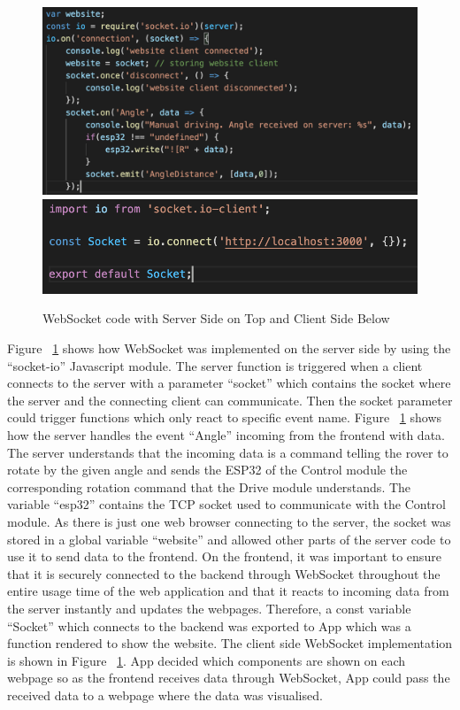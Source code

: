 \documentclass[a4paper]{article}
\begin{document}
\begin{figure}[H]
	\begin{Center}
		\includegraphics[width = 0.7\linewidth]{./images/WebSocket.png}
        \includegraphics[width = 0.7\linewidth]{./images/SocketClient.png}
		\caption{WebSocket code with Server Side on Top and Client Side Below}
        \label{fig:websocketServer}
	\end{Center}
\end{figure}



Figure ~\ref{fig:websocketServer} shows how WebSocket was implemented on the server 
side by using the “socket-io” Javascript module. \cite{WebSocketAPI} The server function is triggered 
when a client connects to the server with a parameter “socket” which contains the socket where 
the server and the connecting client can communicate. Then the socket parameter could trigger 
functions which only react to specific event name. Figure ~\ref{fig:websocketServer} shows how the server handles the 
event “Angle” incoming from the frontend with data. The server understands that the incoming 
data is a command telling the rover to rotate by the given angle and sends the ESP32 of the Control 
module the corresponding rotation command that the Drive module understands. The variable “esp32” 
contains the TCP socket used to communicate with the Control module. As there is just one 
web browser connecting to the server, the socket was stored in a global variable “website” and 
allowed other parts of the server code to use it to send data to the frontend. On the frontend, 
it was important to ensure that it is securely connected to the backend through WebSocket throughout 
the entire usage time of the web application and that it reacts to incoming data from the server 
instantly and updates the webpages. Therefore, a const variable “Socket” which connects to the 
backend was exported to App which was a function rendered to show the website. The client side WebSocket implementation 
is shown in Figure ~\ref{fig:websocketServer}. App decided which 
components are shown on each webpage so as the frontend receives data through WebSocket, App could 
pass the received data to a webpage where the data was visualised. 
\end{document}
